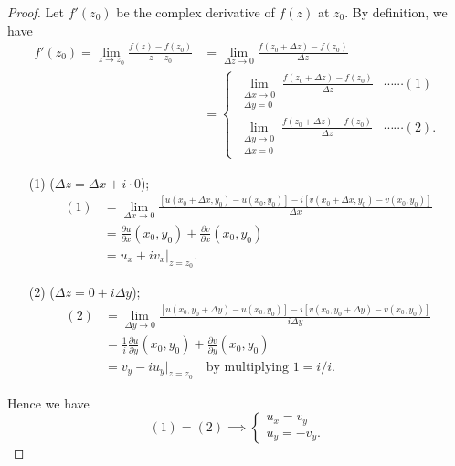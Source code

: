 \documentclass[12pt,openany]{book}
\theoremstyle{definition}
\newcommand{\of}[1]{\left( #1 \right)}
\begin{document}
	\begin{proof}
		Let $f'(z_0)$ be the complex derivative of $f(z)$ at $z_0$. By definition, we have \begin{align*}
			f'(z_0) = \lim_{z \to z_0} \frac{f(z) - f(z_0)}{z - z_0}&=\lim_{\Delta z\to 0}\frac{f\of{z_0+\Delta z}-f\of{z_0}}{\Delta z}\\&=\begin{cases}
				\displaystyle\lim\limits_{\substack{\Delta x\to 0\\ \Delta y=0}}\frac{f\of{z_0+\Delta z}-f\of{z_0}}{\Delta z} &\cdots\cdots(1)\\
				\displaystyle\lim\limits_{\substack{\Delta y\to 0\\ \Delta x=0}}\frac{f\of{z_0+\Delta z}-f\of{z_0}}{\Delta z}&\cdots\cdots(2).
			\end{cases}
		\end{align*}
		
		\begin{itemize}
			\item[(1)] ($\Delta z=\Delta x+i\cdot 0$);
			\begin{align*}
				(1)&=\lim\limits_{\Delta x\to 0}\frac{\left[u(x_0+\Delta x, y_0)-u\of{x_0,y_0}\right]-i\left[v(x_0+\Delta x,y_0)-v\of{x_0,y_0}\right]}{\Delta x}\\
				&=\frac{\partial u}{\partial x}\of{x_0,y_0}+\frac{\partial v}{\partial x}\of{x_0,y_0}\\
				&= u_x+iv_x\bigg|_{z=z_0}.
			\end{align*}
			\item[(2)] ($\Delta z=0+i\Delta y$);
			\begin{align*}
				(2)&=\lim\limits_{\Delta y\to 0}\frac{\left[u(x_0, y_0+\Delta y)-u\of{x_0,y_0}\right]-i\left[v(x_0,y_0+\Delta y)-v\of{x_0,y_0}\right]}{i\Delta y}\\
				&=\frac{1}{i}\frac{\partial u}{\partial y}\of{x_0,y_0}+\frac{\partial v}{\partial y}\of{x_0,y_0}\\
				&= v_y-iu_y\bigg|_{z=z_0}\quad\text{by multiplying $1=i/i$}.
			\end{align*}
		\end{itemize} Hence we have \[
		(1)=(2)\implies\begin{cases}
			u_x=v_y\\
			u_y=-v_y.
		\end{cases}
		\]
	\end{proof}
	
\end{document}
